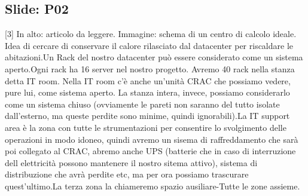 \subsection{Slide: P02}
[3] In alto: articolo da leggere. Immagine: schema di un centro di calcolo ideale. Idea di cercare di conservare il calore rilasciato dal datacenter per riscaldare le abitazioni.\newline
[4] Un Rack del nostro datacenter può essere considerato come un sistema aperto.\newline
[5] Ogni rack ha 16 server nel nostro progetto. \newline
[6] Avremo 40 rack nella stanza detta IT room. Nella IT room c'è anche un'unità CRAC che possiamo vedere, pure lui, come sistema aperto. La stanza intera, invece, possiamo considerarlo come un sistema chiuso (ovviamente le pareti non saranno del tutto isolate dall'esterno, ma queste perdite sono minime, quindi ignorabili).\newline
[7] La IT support area è la zona con tutte le strumentazioni per consentire lo svolgimento delle operazioni in modo idoneo, quindi avremo un sisema di raffreddamento che sarà poi collegato al CRAC, abremo anche UPS (batterie che in caso di interruzione dell elettricità possono mantenere il nostro sitema attivo), sistema di distribuzione che avrà perdite etc, ma per ora possiamo trascurare quest'ultimo.\newline
[8] La terza zona la chiameremo spazio ausiliare-\newline
[9] Tutte le zone assieme.\newline
[10]